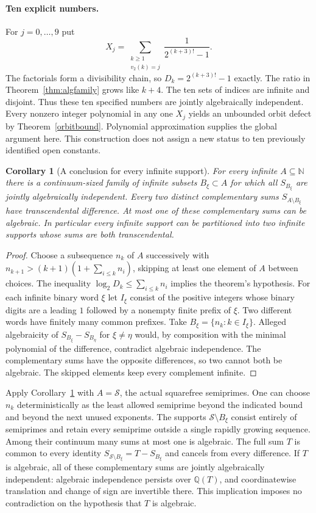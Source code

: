\documentclass[11pt,letterpaper]{article}
\newtheorem{corollary}[theorem]{Corollary}
\newcommand{\Q}{\mathbb Q}
\newcommand{\N}{\mathbb N}
\begin{document}
\paragraph{Ten explicit numbers.}
For $j=0,\ldots,9$ put
\[
 X_j=\sum_{\substack{k\ge1\\v_2(k)=j}}\frac1{2^{(k+3)!}-1}.
\]
The factorials form a divisibility chain, so $D_k=2^{(k+3)!}-1$
exactly. The ratio in Theorem~\ref{thm:algfamily} grows like $k+4$.
The ten sets of indices are infinite and disjoint. Thus these ten
specified numbers are jointly algebraically independent. Every
nonzero integer polynomial in any one $X_j$ yields an unbounded orbit
defect by Theorem~\ref{orbitbound}. Polynomial approximation supplies
the global argument here. This construction does not assign a new
status to ten previously identified open constants.

\begin{corollary}[A conclusion for every infinite support]\label{cor:arbitrarysplit}
For every infinite $A\subseteq\N$ there is a continuum-sized family of
infinite subsets $B_\xi\subset A$ for which all $S_{B_\xi}$ are jointly
algebraically independent. Every two distinct complementary sums
$S_{A\setminus B_\xi}$ have transcendental difference. At most one of
these complementary sums can be algebraic. In particular every infinite
support can be partitioned into two infinite supports whose sums are both
transcendental.
\end{corollary}
\begin{proof}
Choose a subsequence $n_k$ of $A$ successively with
$n_{k+1}>(k+1)(1+\sum_{i\le k} n_i)$, skipping at least one element of
$A$ between choices. The inequality
$\log_2D_k\le\sum_{i\le k}n_i$ implies the theorem's hypothesis. For each
infinite binary word $\xi$ let $I_\xi$ consist of the positive integers
whose binary digits are a leading $1$ followed by a nonempty finite prefix
of $\xi$. Two different words have finitely many common prefixes. Take
$B_\xi=\{n_k:k\in I_\xi\}$. Alleged algebraicity of
$S_{B_\xi}-S_{B_\eta}$ for $\xi\ne\eta$ would, by composition with
the minimal polynomial of the difference, contradict algebraic
independence. The complementary sums have the opposite differences,
so two cannot both be algebraic. The skipped elements keep every
complement infinite.
\end{proof}

Apply Corollary~\ref{cor:arbitrarysplit} with $A=\mathcal S$, the actual
squarefree semiprimes. One can choose $n_k$ deterministically as the
least allowed semiprime beyond the indicated bound and beyond the next
unused exponents. The supports $\mathcal S\setminus B_\xi$ consist
entirely of semiprimes and retain every semiprime outside a single
rapidly growing sequence. Among their continuum many sums at most
one is algebraic. The full sum $T$ is common to every identity
$S_{\mathcal S\setminus B_\xi}=T-S_{B_\xi}$ and cancels from every
difference. If $T$ is algebraic, all of these complementary sums are
jointly algebraically independent: algebraic independence persists
over $\Q(T)$, and coordinatewise translation and change of sign are
invertible there. This implication imposes no contradiction on the
hypothesis that $T$ is algebraic.
\end{document}
